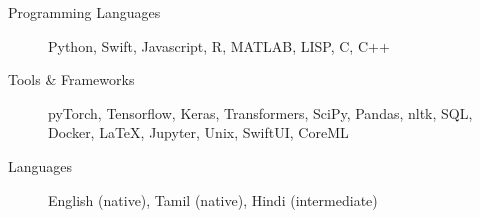 \begin{description}
\item[Programming Languages] Python, Swift, Javascript, R, MATLAB, LISP, C, C++

\item[Tools \& Frameworks] pyTorch, Tensorflow, Keras, Transformers, SciPy, Pandas, nltk, SQL, Docker, \LaTeX, Jupyter, Unix, SwiftUI, CoreML

\item[Languages] English (native), Tamil (native), Hindi (intermediate)
\end{description}
